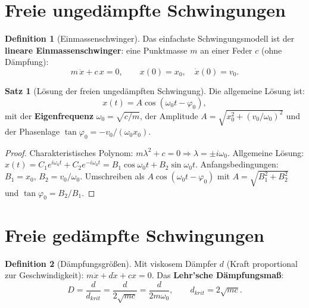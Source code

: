 ﻿\documentclass[a4paper,12pt]{report}
\theoremstyle{definition}
\newtheorem{definition}{Definition}
\newtheorem{satz}{Satz}
\begin{document}
\section{Freie unged\"ampfte Schwingungen}

\begin{definition}[Einmassenschwinger]
Das einfachste Schwingungsmodell ist der \textbf{lineare Einmassenschwinger}:
eine Punktmasse $m$ an einer Feder $c$ (ohne D\"ampfung):
\[
  m\,\ddot{x} + c\,x = 0, \qquad x(0) = x_0, \quad \dot{x}(0) = v_0.
\]
\end{definition}

\begin{satz}[L\"osung der freien unged\"ampften Schwingung]
Die allgemeine L\"osung ist:
\[
  x(t) = A\cos(\omega_0 t - \varphi_0),
\]
mit der \textbf{Eigenfrequenz} $\omega_0 = \sqrt{c/m}$, der Amplitude
$A = \sqrt{x_0^2 + (v_0/\omega_0)^2}$ und der Phasenlage
$\tan\varphi_0 = -v_0/(\omega_0 x_0)$.
\end{satz}
\begin{proof}
Charakteristisches Polynom: $m\lambda^2 + c = 0 \Rightarrow \lambda = \pm i\omega_0$.
Allgemeine L\"osung: $x(t) = C_1 e^{i\omega_0 t} + C_2 e^{-i\omega_0 t}
= B_1\cos\omega_0 t + B_2\sin\omega_0 t$.
Anfangsbedingungen: $B_1 = x_0$, $B_2 = v_0/\omega_0$.
Umschreiben als $A\cos(\omega_0 t - \varphi_0)$ mit
$A = \sqrt{B_1^2 + B_2^2}$ und $\tan\varphi_0 = B_2/B_1$.
\end{proof}

\section{Freie ged\"ampfte Schwingungen}

\begin{definition}[D\"ampfungsgr\"o\ss{}en]
Mit viskosem D\"ampfer $d$ (Kraft proportional zur Geschwindigkeit):
$m\ddot{x} + d\dot{x} + cx = 0$.
Das \textbf{Lehr'sche D\"ampfungsma\ss{}}:
\[
  D = \frac{d}{d_{krit}} = \frac{d}{2\sqrt{mc}} = \frac{d}{2m\omega_0},
  \qquad d_{krit} = 2\sqrt{mc}.
\]
\end{definition}
\end{document}

